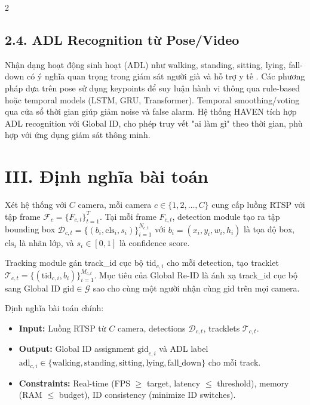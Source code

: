 \documentclass[a4paper,13pt]{article}
\begin{document}
\begin{multicols}{2}
\subsection*{2.4. ADL Recognition từ Pose/Video}
Nhận dạng hoạt động sinh hoạt (ADL) như walking, standing, sitting, lying, fall-down có ý nghĩa quan trọng trong giám sát người già và hỗ trợ y tế \cite{cao2017openpose}. Các phương pháp dựa trên pose sử dụng keypoints để suy luận hành vi thông qua rule-based hoặc temporal models (LSTM, GRU, Transformer). Temporal smoothing/voting qua cửa sổ thời gian giúp giảm noise và false alarm. Hệ thống HAVEN tích hợp ADL recognition với Global ID, cho phép truy vết "ai làm gì" theo thời gian, phù hợp với ứng dụng giám sát thông minh.

\section*{III. Định nghĩa bài toán}

Xét hệ thống với $C$ camera, mỗi camera $c \in \{1, 2, \ldots, C\}$ cung cấp luồng RTSP với tập frame $\mathcal{F}_c = \{F_{c,t}\}_{t=1}^{T}$. Tại mỗi frame $F_{c,t}$, detection module tạo ra tập bounding box $\mathcal{D}_{c,t} = \{(b_i, \text{cls}_i, s_i)\}_{i=1}^{N_{c,t}}$ với $b_i = (x_i, y_i, w_i, h_i)$ là tọa độ box, $\text{cls}_i$ là nhãn lớp, và $s_i \in [0,1]$ là confidence score.

Tracking module gán track\_id cục bộ $\text{tid}_{c,i}$ cho mỗi detection, tạo tracklet $\mathcal{T}_{c,t} = \{(\text{tid}_{c,i}, b_i)\}_{i=1}^{M_{c,t}}$. Mục tiêu của Global Re-ID là ánh xạ track\_id cục bộ sang Global ID $\text{gid} \in \mathcal{G}$ sao cho cùng một người nhận cùng gid trên mọi camera.

Định nghĩa bài toán chính:
\begin{itemize}
    \item \textbf{Input:} Luồng RTSP từ $C$ camera, detections $\mathcal{D}_{c,t}$, tracklets $\mathcal{T}_{c,t}$.
    \item \textbf{Output:} Global ID assignment $\text{gid}_{c,i}$ và ADL label $\text{adl}_{c,i} \in \{\text{walking}, \text{standing}, \text{sitting}, \text{lying}, \text{fall\_down}\}$ cho mỗi track.
    \item \textbf{Constraints:} Real-time (FPS $\geq$ target, latency $\leq$ threshold), memory (RAM $\leq$ budget), ID consistency (minimize ID switches).
\end{itemize}


\end{multicols}
\end{document}
